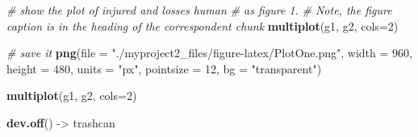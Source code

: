 \documentclass[12pt,spanish, american,b4paper, onecolumn, lmargin=1cm, rmargin=1cm, tmargin=1cm, bmargin=2cm,]{article}
\newenvironment{Shaded}{}{}
\newcommand{\KeywordTok}[1]{\textbf{{#1}}}
\newcommand{\DataTypeTok}[1]{\textcolor[rgb]{0.50,0.00,0.00}{{#1}}}
\newcommand{\DecValTok}[1]{\textcolor[rgb]{0.00,0.00,1.00}{{#1}}}
\newcommand{\StringTok}[1]{\textcolor[rgb]{0.87,0.00,0.00}{{#1}}}
\newcommand{\CommentTok}[1]{\textcolor[rgb]{0.50,0.50,0.50}{\textit{{#1}}}}
\newcommand{\NormalTok}[1]{{#1}}
\begin{document}
\begin{Shaded}
\begin{Highlighting}[]
\CommentTok{# show the plot of injured and losses human }
\CommentTok{# as figure 1.}
\CommentTok{# Note, the figure caption is in the heading of the correspondent chunk}
\KeywordTok{multiplot}\NormalTok{(g1, g2, }\DataTypeTok{cols=}\DecValTok{2}\NormalTok{)}

\CommentTok{# save it}
\KeywordTok{png}\NormalTok{(}\DataTypeTok{file =} \StringTok{"./myproject2_files/figure-latex/PlotOne.png"}\NormalTok{, }
    \DataTypeTok{width =} \DecValTok{960}\NormalTok{, }
    \DataTypeTok{height =} \DecValTok{480}\NormalTok{, }
    \DataTypeTok{units =} \StringTok{"px"}\NormalTok{, }
    \DataTypeTok{pointsize =} \DecValTok{12}\NormalTok{,}
    \DataTypeTok{bg =} \StringTok{"transparent"}\NormalTok{)}

\KeywordTok{multiplot}\NormalTok{(g1, g2, }\DataTypeTok{cols=}\DecValTok{2}\NormalTok{)}

\KeywordTok{dev.off}\NormalTok{() ->}\StringTok{ }\NormalTok{trashcan}
\end{Highlighting}
\end{Shaded}
\end{document}
